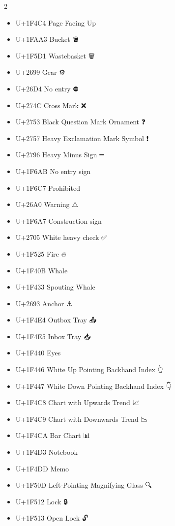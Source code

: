 \begin{multicols}{2}
\begin{itemize}
    \item U+1F4C4 Page Facing Up      📄
    \item U+1FAA3 Bucket              🪣
    \item U+1F5D1 Wastebasket         🗑
    \item U+2699  Gear                ⚙
    \item U+26D4  No entry            ⛔
    \item U+274C  Cross Mark          ❌
    \item U+2753  Black Question Mark Ornament  ❓
    \item U+2757  Heavy Exclamation Mark Symbol ❗
    \item U+2796  Heavy Minus Sign              ➖
    \item U+1F6AB No entry sign       🚫
    \item U+1F6C7 Prohibited          %
    \item U+26A0  Warning             ⚠
    \item U+1F6A7 Construction sign   🚧
    \item U+2705  White heavy check   ✅
    \item U+1F525 Fire                🔥
    \item U+1F40B Whale               🐋
    \item U+1F433 Spouting Whale      🐳
    \item U+2693 Anchor               ⚓
    \item U+1F4E4 Outbox Tray         📤
    \item U+1F4E5 Inbox Tray          📥
    \item U+1F440 Eyes                👀
    \item U+1F446 White Up Pointing Backhand Index   👆
    \item U+1F447 White Down Pointing Backhand Index 👇
    \item U+1F4C8 Chart with Upwards Trend           📈
    \item U+1F4C9 Chart with Downwards Trend         📉
    \item U+1F4CA Bar Chart                          📊
    \item U+1F4D3 Notebook                           📓
    \item U+1F4DD Memo                               📝
    \item U+1F50D Left-Pointing Magnifying Glass     🔍
    \item U+1F512 Lock                               🔒
    \item U+1F513 Open Lock                          🔓

\end{itemize}
\end{multicols}
